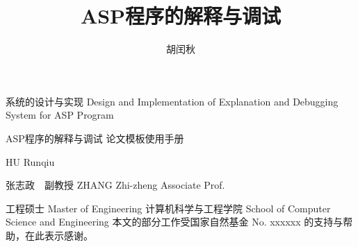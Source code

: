 \documentclass[algorithmlist,figurelist,tablelist,nomlist,engineer]{seumasterthesis}
\begin{document}

\title
    {ASP程序的解释与调试}                                      %
    {系统的设计与实现}                                          %
    {Design and Implementation of}  %
    {Explanation and Debugging System for ASP Program}            %

\spine
    {ASP程序的解释与调试  论文模板使用手册}      %
    {}                                                          %

\author
    {胡闰秋}                        %
    {HU Runqiu}                 %

\advisor
    {张志政\ \ 副教授}                       %
    {ZHANG Zhi-zheng}           %
    {Associate Prof.}                     %


\degreetype                     %
    {工程硕士}
    {Master of Engineering}
\submajor{}               %
\department                     %
    {计算机科学与工程学院}
    {School of Computer Science and Engineering}
\seuthesisthanks                %
    {本文的部分工作受国家自然基金 No. xxxxxx 的支持与帮助，在此表示感谢。}
\end{document}
